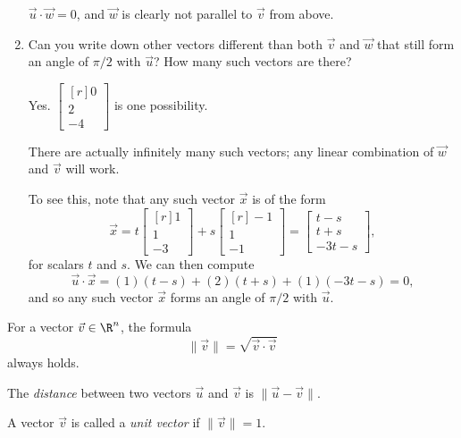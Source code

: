 \documentclass{problemset}
\newcommand{\mat}[1]{\begin{bmatrix*}[r]#1\end{bmatrix*}}
\newcommand{\matc}[1]{\begin{bmatrix}#1\end{bmatrix}}
\begin{document}
\begin{parts}
\begin{enumerate}
\begin{solution}
					$\vec u \cdot \vec w = 0$, and $\vec w$ is clearly not parallel 
					to $\vec v$ from above.
				\end{solution}
			\item Can you write down other vectors different than both $\vec v$ 
				and $\vec w$ that still	form an angle of $\pi/2$ with $\vec u$? 
				How many such vectors are there?
				\begin{solution}
					Yes. $\mat{0\\2\\-4}$ is one possibility. 

					There are actually infinitely many such vectors; any linear
					combination of $\vec w$ and $\vec v$ will work. 

					To see this, note that any such vector $\vec x$ is of the form
					\[
						\vec x = t \mat{1\\1\\-3} + s \mat{-1\\1\\-1} 
						= \matc{t-s\\t+s\\-3t-s},
					\]
					for scalars $t$ and $s$. We can then compute
					\[
						\vec u \cdot \vec x = (1)(t-s) + (2)(t+s) + (1)(-3t-s) = 0,
					\]
					and so any such vector $\vec x$ forms an angle of $\pi/2$ 
					with $\vec u$. 
				\end{solution}
		\end{enumerate}
	\end{parts}

	\newpage
	\begin{theorem}
		For a vector $\vec v\in \R^n$, the formula
		\[
			\|\vec v\| = \sqrt{\vec v\cdot \vec v}
		\]
		always holds.
	\end{theorem}

	\begin{definition}[Distance]
		The \emph{distance} between two vectors $\vec u$ and $\vec v$ is $\|\vec u-\vec v\|$.
	\end{definition}
	\begin{definition}
		A vector $\vec v$ is called a \emph{unit vector} if $\|\vec v\|=1$.
	\end{definition}
	
\end{document}
